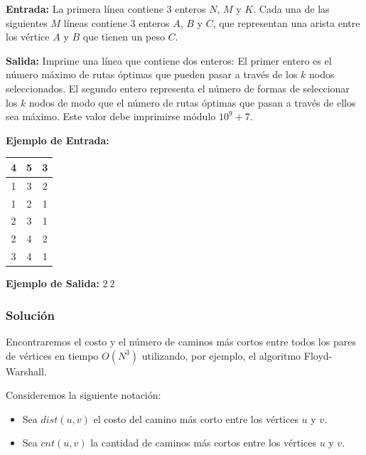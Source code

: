 \documentclass[12pt]{article}
\newcommand{\nl}{\vspace{0.3cm}}
\begin{document}
\nl

\textbf{Entrada:} La primera línea contiene $3$ enteros $N$, $M$ y $K$. Cada una de las siguientes $M$ líneas contiene $3$ enteros $A$, $B$ y $C$, que representan una arista entre los vértice $A$ y $B$ que tienen un peso $C$.

\nl

\textbf{Salida:} Imprime una línea que contiene dos enteros: El primer entero es el número máximo de rutas óptimas que pueden pasar a través de los $k$ nodos seleccionados. El segundo entero representa el número de formas de seleccionar los $k$ nodos de modo que el número de rutas óptimas que pasan a través de ellos sea máximo. Este valor debe imprimirse módulo $10^9 +7$.

\newpage

\textbf{Ejemplo de Entrada:}

\nl

\begin{tabular}{|c|c|c|}
	\hline 4 & 5 & 3 \\ 
	\hline 1 & 3 & 2 \\ 
	\hline 1 & 2 & 1 \\ 
	\hline 2 & 3 & 1 \\ 
	\hline 2 & 4 & 2 \\ 
	\hline 3 & 4 & 1 \\ 
	\hline 
\end{tabular}

\nl

\textbf{Ejemplo de Salida:} $2\ 2$

\subsubsection{Solución}

\nl

Encontraremos el costo y el número de caminos más cortos entre todos los pares de vértices en tiempo $O(N^3)$ utilizando, por ejemplo, el algoritmo Floyd-Warshall.

\nl

Consideremos la siguiente notación:

\nl

\begin{itemize}
	\item Sea $dist(u, v)$ el costo del camino más corto entre los vértices $u$ y $v$.
	\item Sea $cnt(u, v)$ la cantidad de caminos más cortos entre los vértices $u$ y $v$.
\end{itemize}
\end{document}
